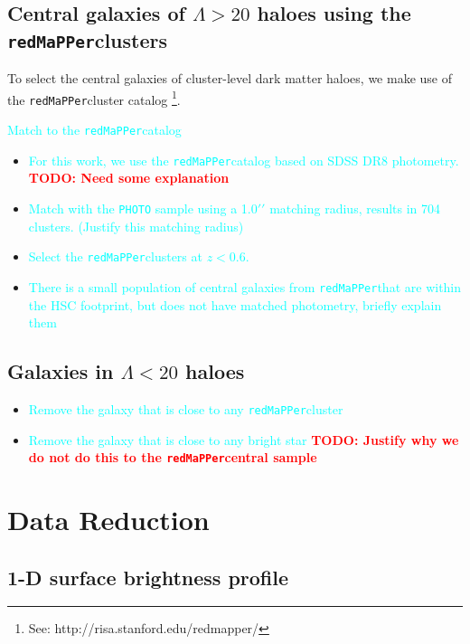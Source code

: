 \documentclass[preprint]{aastex}
\def\arcsec{{\prime\prime}}
\def\redm{\texttt{redMaPPer}}
\newcommand{\todo}[1]{\textcolor{red}{\textbf{TODO: #1}}}
\newcommand{\plan}[1]{\textcolor{cyan}{#1}}
\begin{document}
\begin{CJK*}{UTF8}{gbsn}
\subsection{Central galaxies of $\Lambda > 20$ haloes using the \redm clusters}

    To select the central galaxies of cluster-level dark matter haloes, we make use of the 
    \redm cluster catalog \footnote{See: http://risa.stanford.edu/redmapper/}. 
    
    \plan{Match to the \redm catalog}
    \begin{itemize}
        \item \plan{For this work, we use the \redm catalog based on SDSS DR8 
            photometry.} \todo{Need some explanation}
        \item \plan{Match with the \texttt{PHOTO} sample using a 1.0$\arcsec$
            matching radius, results in 704 clusters. (Justify this matching radius)}
        \item \plan{Select the \redm clusters at $z < 0.6$.}
        \item \plan{There is a small population of central galaxies from \redm that
            are within the HSC footprint, but does not have matched photometry, 
            briefly explain them}
    \end{itemize}

\subsection{Galaxies in $\Lambda < 20$ haloes}

    \begin{itemize}
        \item \plan{Remove the galaxy that is close to any \redm cluster}
        \item \plan{Remove the galaxy that is close to any bright star} 
            \todo{Justify why we do not do this to the \redm central sample}
    \end{itemize}
    

\section{Data Reduction}

\subsection{1-D surface brightness profile}


\end{CJK*}
\end{document}
